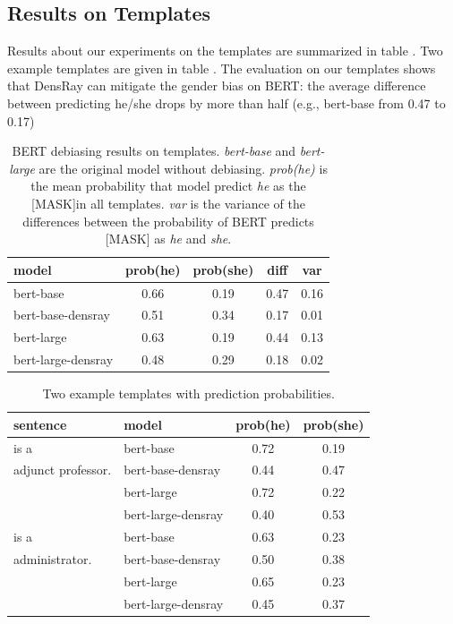 \subsection{Results on Templates}
Results about our experiments on the templates are summarized in table . Two example templates are given in table . The evaluation on our templates shows that DensRay can mitigate the gender bias on BERT: the average difference between predicting he/she drops by more than half (e.g., bert-base from 0.47 to 0.17)
\begin{table}[ht]
\centering
\footnotesize
\begin{tabular}{lcccc}
\hline
model & prob(he) & prob(she) & diff & var\\
\hline
bert-base & 0.66 & 0.19 & 0.47 & 0.16 \\
bert-base-densray & 0.51 & 0.34 & {0.17} & 0.01\\
\hline
bert-large  & 0.63 & 0.19 & 0.44 & 0.13 \\
bert-large-densray  & 0.48 & 0.29 & {0.18} & 0.02\\
\hline
\end{tabular}
\caption{
BERT debiasing results on templates. \textit{bert-base} and \textit{bert-large} are the original model without debiasing. \textit{prob(he)} is the mean probability that model predict \textit{he} as the [MASK]in all templates. \textit{var} is the variance of the differences between the probability of BERT predicts [MASK] as \textit{he} and \textit{she}.}
\end{table}
\begin{table}[ht]
\centering
\footnotesize
\begin{tabular}{llcc}
\hline
sentence & model & prob(he) & prob(she)\\
\hline
[MASK] is a & 
\scriptsize bert-base 
& 0.72 & 0.19\\
adjunct professor. & 
\scriptsize bert-base-densray 
& 0.44 & 0.47\\
&\scriptsize bert-large
& 0.72 & 0.22\\
&\scriptsize bert-large-densray& 0.40 & 0.53\\
\hline
[MASK] is a 
&\scriptsize bert-base 
& 0.63 & 0.23\\
administrator.  
&\scriptsize bert-base-densray 
& 0.50 & 0.38\\
&\scriptsize bert-large & 0.65 & 0.23\\
&\scriptsize bert-large-densray & 0.45 & 0.37\\
\hline
\end{tabular}
\caption{
Two example templates with prediction probabilities.}
\end{table}
